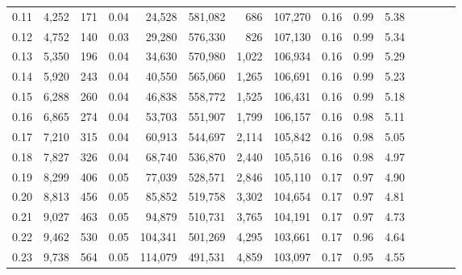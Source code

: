 \begin{tabular}{rrrcrrrrrrrrrrr}
0.11 &   4,252 &    171 &                                       0.04 &   24,528 &  581,082 &      686 &  107,270 &  0.16 &  0.99 &                         5.38 \\
0.12 &   4,752 &    140 &                                       0.03 &   29,280 &  576,330 &      826 &  107,130 &  0.16 &  0.99 &                         5.34 \\
0.13 &   5,350 &    196 &                                       0.04 &   34,630 &  570,980 &    1,022 &  106,934 &  0.16 &  0.99 &                         5.29 \\
0.14 &   5,920 &    243 &                                       0.04 &   40,550 &  565,060 &    1,265 &  106,691 &  0.16 &  0.99 &                         5.23 \\
0.15 &   6,288 &    260 &                                       0.04 &   46,838 &  558,772 &    1,525 &  106,431 &  0.16 &  0.99 &                         5.18 \\
0.16 &   6,865 &    274 &                                       0.04 &   53,703 &  551,907 &    1,799 &  106,157 &  0.16 &  0.98 &                         5.11 \\
0.17 &   7,210 &    315 &                                       0.04 &   60,913 &  544,697 &    2,114 &  105,842 &  0.16 &  0.98 &                         5.05 \\
0.18 &   7,827 &    326 &                                       0.04 &   68,740 &  536,870 &    2,440 &  105,516 &  0.16 &  0.98 &                         4.97 \\
0.19 &   8,299 &    406 &                                       0.05 &   77,039 &  528,571 &    2,846 &  105,110 &  0.17 &  0.97 &                         4.90 \\
0.20 &   8,813 &    456 &                                       0.05 &   85,852 &  519,758 &    3,302 &  104,654 &  0.17 &  0.97 &                         4.81 \\
0.21 &   9,027 &    463 &                                       0.05 &   94,879 &  510,731 &    3,765 &  104,191 &  0.17 &  0.97 &                         4.73 \\
0.22 &   9,462 &    530 &                                       0.05 &  104,341 &  501,269 &    4,295 &  103,661 &  0.17 &  0.96 &                         4.64 \\
0.23 &   9,738 &    564 &                                       0.05 &  114,079 &  491,531 &    4,859 &  103,097 &  0.17 &  0.95 &                         4.55 \\

\end{tabular}
